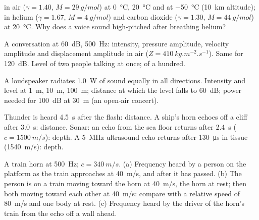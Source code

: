 \begin{exercise}[$\star$]\label{exo:b2:sound-waves:1}
 in air ($\gamma = 1.40$, $M = \qty{29}{g/mol}$) at
\qty{0}{\degreeCelsius}, \qty{20}{\degreeCelsius} and at \qty{-50}{\degreeCelsius}
(\qty{10}{km} altitude); in helium ($\gamma = 1.67$, $M = \qty{4}{g/mol}$) and
carbon dioxide ($\gamma = 1.30$, $M = \qty{44}{g/mol}$) at \qty{20}{\degreeCelsius}.
Why does a voice sound high-pitched after breathing helium?
\end{exercise}

\begin{exercise}[$\star$]\label{exo:b2:sound-waves:2}
A conversation at \qty{60}{dB}, \qty{500}{Hz}: intensity, pressure
amplitude, velocity amplitude and displacement amplitude in air
($Z = \qty{410}{kg.m^{-2}.s^{-1}}$). Same for \qty{120}{dB}. Level of two
people talking at once; of a hundred.
\end{exercise}

\begin{exercise}[$\star$]\label{exo:b2:sound-waves:3}
A loudspeaker radiates \qty{1.0}{W} of sound equally in all directions.
Intensity and level at \qty{1}{m}, \qty{10}{m}, \qty{100}{m}; distance at which
the level falls to \qty{60}{dB}; power needed for \qty{100}{dB} at \qty{30}{m}
(an open-air concert).
\end{exercise}

\begin{exercise}[$\star$]\label{exo:b2:sound-waves:4}
Thunder is heard \qty{4.5}{s} after the flash: distance. A ship's horn
echoes off a cliff after \qty{3.0}{s}: distance. Sonar: an echo from the
sea floor returns after \qty{2.4}{s} ($c = \qty{1500}{m/s}$): depth. A
\qty{5}{MHz} ultrasound echo returns after \qty{130}{\micro s} in tissue
(\qty{1540}{m/s}): depth.
\end{exercise}

\begin{exercise}[$\star\star$]\label{exo:b2:sound-waves:5}
A train horn at \qty{500}{Hz}; $c = \qty{340}{m/s}$. (a) Frequency heard by a
person on the platform as the train approaches at \qty{40}{m/s}, and
after it has passed. (b) The person is on a train moving toward the
horn at \qty{40}{m/s}, the horn at rest; then both moving toward each
other at \qty{40}{m/s}: compare with a relative speed of \qty{80}{m/s} and
one body at rest. (c) Frequency heard by the driver of the horn's train
from the echo off a wall ahead.
\end{exercise}

